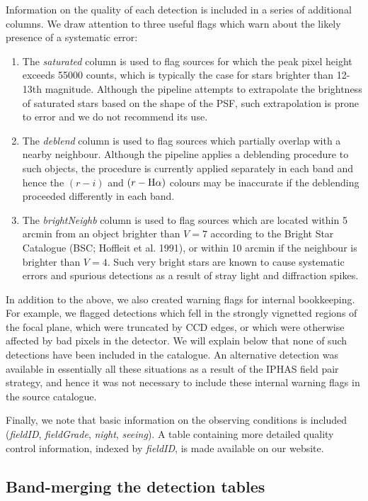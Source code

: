 \documentclass[useAMS,usenatbib]{mn2e}
\def\ha{\mbox{H$\rm \alpha$}}
\begin{document}
Information on the quality of each detection is included 
in a series of additional columns.
We draw attention to three useful flags
which warn about the likely presence of a systematic error:
\begin{enumerate}
\item The \emph{saturated} column is used to flag sources
for which the peak pixel height exceeds 55000 counts,
which is typically the case for stars brighter than 12-13th magnitude.
Although the pipeline attempts to extrapolate the brightness of
saturated stars based on the shape of the PSF,
such extrapolation is prone to error
and we do not recommend its use.
\item The \emph{deblend} column is used to flag sources 
which partially overlap with a nearby neighbour.
Although the pipeline applies a deblending procedure
to such objects, the procedure is currently applied separately
in each band and hence the $(r-i)$ and $(r-\ha)$ colours
may be inaccurate if the deblending proceeded differently in each band.
\item The \emph{brightNeighb} column is used to flag sources which are located
within 5 arcmin from an object brighter than $V=7$ 
according to the Bright Star Catalogue (BSC; Hoffleit et al. 1991), 
or within 10 arcmin if the neighbour is brighter than $V=4$.
Such very bright stars are known to cause systematic errors
and spurious detections as a result of stray light 
and diffraction spikes.
\end{enumerate}
In addition to the above, we also created warning flags for internal bookkeeping.
For example, we flagged detections which fell in the strongly vignetted regions of the focal plane,
which were truncated by CCD edges,
or which were otherwise affected by bad pixels in the detector.
We will explain below that none of such detections 
have been included in the catalogue.
An alternative detection was available in essentially all these situations
as a result of the IPHAS field pair strategy,
and hence it was not necessary to include these internal warning flags
in the source catalogue.

Finally, we note that basic information on the observing conditions
is included (\emph{fieldID}, \emph{fieldGrade}, \emph{night}, \emph{seeing}).
A table containing more detailed quality control information,
indexed by \emph{fieldID}, is made available on our website.

\subsection{Band-merging the detection tables}
\end{document}

